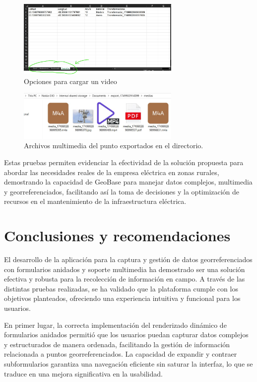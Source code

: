 \documentclass{article}
\begin{document}
\begin{figure}[H]
  \centering
  \includegraphics[width=0.7\textwidth]{images/functionality_test/excel.jpg}
  \caption{Opciones para cargar un video}
  \label{fig:excel}
\end{figure}

\begin{figure}[H]
  \centering
  \includegraphics[width=0.7\textwidth]{images/functionality_test/folder_medias.jpg}
  \caption{Archivos multimedia del punto exportados en el directorio.}
  \label{fig:foldermedias}
\end{figure}

Estas pruebas permiten evidenciar la efectividad de la solución propuesta para abordar las necesidades reales de la empresa eléctrica en zonas rurales, demostrando la capacidad de GeoBase para manejar datos complejos, multimedia y georreferenciados, facilitando así la toma de decisiones y la optimización de recursos en el mantenimiento de la infraestructura eléctrica.

\section{Conclusiones y recomendaciones}

El desarrollo de la aplicación para la captura y gestión de datos georreferenciados con formularios anidados y soporte multimedia ha demostrado ser una solución efectiva y robusta para la recolección de información en campo. A través de las distintas pruebas realizadas, se ha validado que la plataforma cumple con los objetivos planteados, ofreciendo una experiencia intuitiva y funcional para los usuarios.

En primer lugar, la correcta implementación del renderizado dinámico de formularios anidados permitió que los usuarios puedan capturar datos complejos y estructurados de manera ordenada, facilitando la gestión de información relacionada a puntos georreferenciados. La capacidad de expandir y contraer subformularios garantiza una navegación eficiente sin saturar la interfaz, lo que se traduce en una mejora significativa en la usabilidad.
\end{document}
